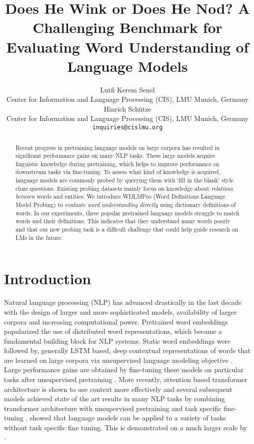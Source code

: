 \documentclass[11pt,a4paper]{article}
\title{%
Does He Wink or Does He Nod?
A Challenging Benchmark for Evaluating Word Understanding of Language Models}
\author{Lutfi Kerem Senel \\
  Center for Information and Language Processing (CIS), LMU Munich, Germany \\
  Hinrich Schütze \\
    Center for Information and Language Processing (CIS), LMU Munich, Germany \\
  \texttt{inquiries@cislmu.org} \\
  }
\date{}
\begin{document}
\maketitle
\begin{abstract}

Recent progress in pretraining language models on large
corpora has resulted in significant performance gains on many NLP
tasks. These large models acquire linguistic knowledge
during pretraining, which helps to improve
performance on downstream tasks via fine-tuning. To assess
what kind of knowledge is acquired,
language models are commonly probed by querying them with
`fill in the blank' style cloze questions. Existing probing
datasets mainly focus on knowledge about \emph{relations between}
words and entities. We introduce WDLMPro
(Word Definitions Language Model Probing) to \emph{evaluate word understanding
  directly} using dictionary definitions of
words. In our experiments, three popular pretrained
language models
struggle to match words and their  definitions. This
indicates that they understand many words poorly and that
our new probing task is a difficult challenge that could
help guide research on LMs in the future.
\end{abstract}



\section{Introduction}

Natural language processing (NLP)  has advanced drastically
in the last decade with the design of larger and more
sophisticated models, availability of larger
corpora and increasing computational
power. Pretrained word embeddings
\cite{mikolov13word2vec_b, pennington14glove} popularized
the use of distributed word representations, which became a
fundamental building block for NLP systems. Static word
embeddings were followed by, generally LSTM based, deep
contextual representations of words that are learned on
large corpora via unsupervised language modeling objective
\cite{peters18ELMO}. Large performance gains are obtained
by fine-tuning these models on particular tasks after
unsupervised pretraining \cite{radford18fineTuning,
  howard18ULMFiT}. More recently, attention based
transformer architecture is shown to use context more
effectively \cite{vaswani17transformers} and several
subsequent models achieved state of the art results in many
NLP tasks by combining transformer architecture with
unsupervised pretraining and task specific fine-tuning
\cite{devlin19BERT, liu19RoBERTa}. 
showed that language models can be applied to a variety of
tasks without task specific fine tuning. This is demonstrated on a much larger scale by . 
\end{document}
